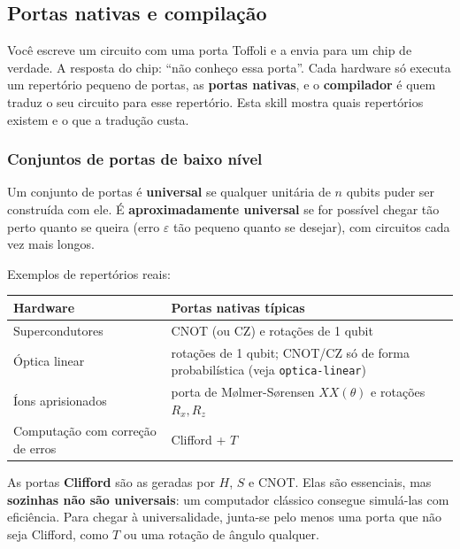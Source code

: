\subsection{Portas nativas e compilação}
Você escreve um circuito com uma porta Toffoli e a envia para um chip de verdade. A resposta do chip: ``não conheço essa porta''. Cada hardware só executa um repertório pequeno de portas, as \textbf{portas nativas}, e o \textbf{compilador} é quem traduz o seu circuito para esse repertório. Esta skill mostra quais repertórios existem e o que a tradução custa.

\subsubsection{Conjuntos de portas de baixo nível}\label{conjuntos-de-portas-de-baixo-nuxedvel}

Um conjunto de portas é \textbf{universal} se qualquer unitária de \(n\) qubits puder ser construída com ele. É \textbf{aproximadamente universal} se for possível chegar tão perto quanto se queira (erro \(\varepsilon\) tão pequeno quanto se desejar), com circuitos cada vez mais longos.

Exemplos de repertórios reais:

\begin{center}\begin{tabular}{ll}
\hline

Hardware
 & 
Portas nativas típicas
 \\
\hline

\hline

Supercondutores & CNOT (ou CZ) e rotações de 1 qubit \\
Óptica linear & rotações de 1 qubit; CNOT/CZ só de forma probabilística (veja \texttt{optica-linear}) \\
Íons aprisionados & porta de Mølmer-Sørensen \(XX(\theta)\) e rotações \(R_x,R_z\) \\
Computação com correção de erros & Clifford + \(T\) \\
\end{tabular}\end{center}

As portas \textbf{Clifford} são as geradas por \(H\), \(S\) e CNOT. Elas são essenciais, mas \textbf{sozinhas não são universais}: um computador clássico consegue simulá-las com eficiência. Para chegar à universalidade, junta-se pelo menos uma porta que não seja Clifford, como \(T\) ou uma rotação de ângulo qualquer.

